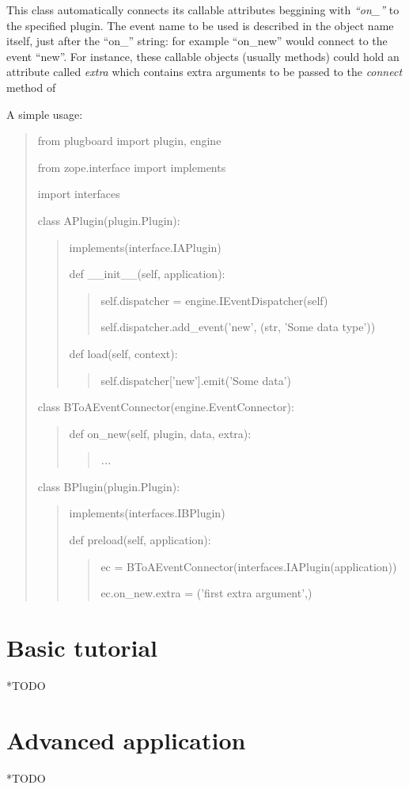 \documentclass[12pt,a4paper]{report}
\begin{document}
This class automatically connects its callable attributes beggining
with \emph{{}``on\_''} to the specified plugin. The event name to
be used is described in the object name itself, just after the {}``on\_''
string: for example {}``on\_new'' would connect to the event {}``new''.
For instance, these callable objects (usually methods) could hold
an attribute called \emph{extra} which contains extra arguments to
be passed to the \emph{connect} method of 

A simple usage:

\begin{quote}
from plugboard import plugin, engine

from zope.interface import implements

import interfaces

class APlugin(plugin.Plugin):
\begin{quote}
implements(interface.IAPlugin)

def \_\_init\_\_(self, application):
\begin{quote}
self.dispatcher = engine.IEventDispatcher(self)

self.dispatcher.add\_event('new', (str, 'Some data type'))
\end{quote}
def load(self, context):
\begin{quote}
self.dispatcher{[}'new'{]}.emit('Some data')
\end{quote}
\end{quote}
class BToAEventConnector(engine.EventConnector):
\begin{quote}
def on\_new(self, plugin, data, extra):
\begin{quote}
\emph{...}
\end{quote}
\end{quote}
class BPlugin(plugin.Plugin):
\begin{quote}
implements(interfaces.IBPlugin)

def preload(self, application):
\begin{quote}
ec = BToAEventConnector(interfaces.IAPlugin(application))

ec.on\_new.extra = ('first extra argument',)
\end{quote}
\end{quote}
\end{quote}

\chapter{Basic tutorial}

{*}TODO


\chapter{Advanced application}

{*}TODO
\end{document}
